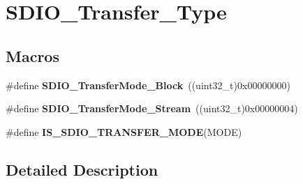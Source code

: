 \hypertarget{group___s_d_i_o___transfer___type}{\section{S\-D\-I\-O\-\_\-\-Transfer\-\_\-\-Type}
\label{group___s_d_i_o___transfer___type}
}
\subsection*{Macros}
\begin{DoxyCompactItemize}
\item 
\hypertarget{group___s_d_i_o___transfer___type_ga5b54ada18cc4072ceff1d98ee4b69972}{\#define {\bfseries S\-D\-I\-O\-\_\-\-Transfer\-Mode\-\_\-\-Block}~((uint32\-\_\-t)0x00000000)}\label{group___s_d_i_o___transfer___type_ga5b54ada18cc4072ceff1d98ee4b69972}

\item 
\hypertarget{group___s_d_i_o___transfer___type_gadd0cafe0a80e6b6cc5c22d838cbb2e28}{\#define {\bfseries S\-D\-I\-O\-\_\-\-Transfer\-Mode\-\_\-\-Stream}~((uint32\-\_\-t)0x00000004)}\label{group___s_d_i_o___transfer___type_gadd0cafe0a80e6b6cc5c22d838cbb2e28}

\item 
\#define {\bfseries I\-S\-\_\-\-S\-D\-I\-O\-\_\-\-T\-R\-A\-N\-S\-F\-E\-R\-\_\-\-M\-O\-D\-E}(M\-O\-D\-E)
\end{DoxyCompactItemize}


\subsection{Detailed Description}


